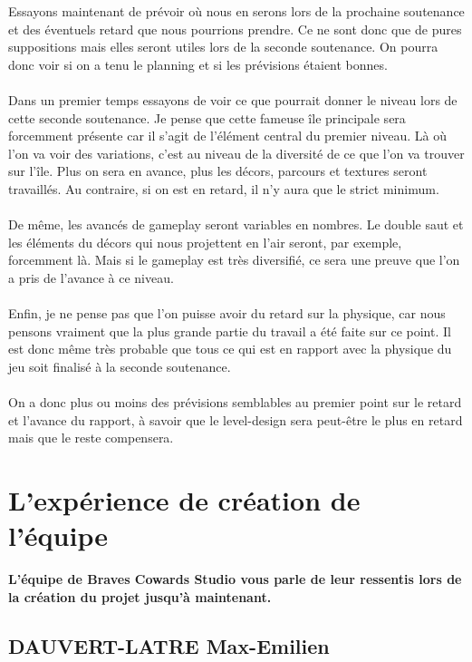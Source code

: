 \documentclass[a4paper]{article}
\begin{document}
Essayons maintenant de prévoir où nous en serons lors de la prochaine soutenance et des éventuels retard que nous pourrions prendre. Ce ne sont donc que de pures suppositions mais elles seront utiles lors de la seconde soutenance. On pourra donc voir si on a tenu le planning et si les prévisions étaient bonnes.\\
\\
Dans un premier temps essayons de voir ce que pourrait donner le niveau lors de cette seconde soutenance. Je pense que cette fameuse île principale sera forcemment présente car il s’agit de l'élément central du premier niveau. Là où l'on va voir des variations, c'est au niveau de la diversité de ce que l'on va trouver sur l'île. Plus on sera en avance, plus les décors, parcours et textures seront travaillés. Au contraire, si on est en retard, il n'y aura que le strict minimum.\\
\\
De même, les avancés de gameplay seront variables en nombres. Le double saut et les éléments du décors qui nous projettent en l'air seront, par exemple, forcemment là. Mais si le gameplay est très diversifié, ce sera une preuve que l'on a pris de l'avance à ce niveau.\\
\\
Enfin, je ne pense pas que l'on puisse avoir du retard sur la physique, car nous pensons vraiment que la plus grande partie du travail a été faite sur ce point. Il est donc même très probable que tous ce qui est en rapport avec la physique du jeu soit finalisé à la seconde soutenance.\\
\\
On a donc plus ou moins des prévisions semblables au premier point sur le retard et l'avance du rapport, à savoir que le level-design sera peut-être le plus en retard mais que le reste compensera.

\pagebreak


\section{L'expérience de création de l'équipe}
\vspace{0.3 cm}

\textbf{L'équipe de Braves Cowards Studio vous parle de leur ressentis lors de la création du projet jusqu'à maintenant.}
\\


\subsection{DAUVERT-LATRE Max-Emilien}
\vspace{0.5 cm}
\end{document}
